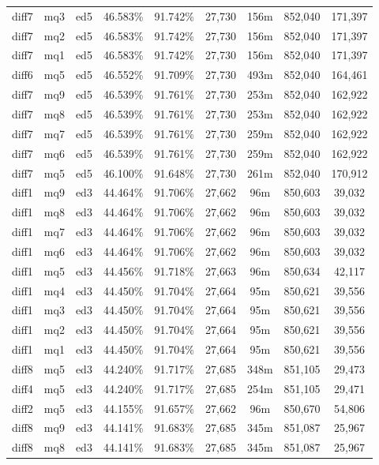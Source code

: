 \begin{landscape}
\begin{longtable}{|c|c|c||c|c||c|c|c|c|}
diff7 & mq3 & ed5 & 46.583\% & 91.742\% & 27,730 & 156m & 852,040 & 171,397 \\
diff7 & mq2 & ed5 & 46.583\% & 91.742\% & 27,730 & 156m & 852,040 & 171,397 \\
diff7 & mq1 & ed5 & 46.583\% & 91.742\% & 27,730 & 156m & 852,040 & 171,397 \\
diff6 & mq5 & ed5 & 46.552\% & 91.709\% & 27,730 & 493m & 852,040 & 164,461 \\
diff7 & mq9 & ed5 & 46.539\% & 91.761\% & 27,730 & 253m & 852,040 & 162,922 \\
diff7 & mq8 & ed5 & 46.539\% & 91.761\% & 27,730 & 253m & 852,040 & 162,922 \\
diff7 & mq7 & ed5 & 46.539\% & 91.761\% & 27,730 & 259m & 852,040 & 162,922 \\
diff7 & mq6 & ed5 & 46.539\% & 91.761\% & 27,730 & 259m & 852,040 & 162,922 \\
diff7 & mq5 & ed5 & 46.100\% & 91.648\% & 27,730 & 261m & 852,040 & 170,912 \\
diff1 & mq9 & ed3 & 44.464\% & 91.706\% & 27,662 & 96m & 850,603 & 39,032 \\
diff1 & mq8 & ed3 & 44.464\% & 91.706\% & 27,662 & 96m & 850,603 & 39,032 \\
diff1 & mq7 & ed3 & 44.464\% & 91.706\% & 27,662 & 96m & 850,603 & 39,032 \\
diff1 & mq6 & ed3 & 44.464\% & 91.706\% & 27,662 & 96m & 850,603 & 39,032 \\
diff1 & mq5 & ed3 & 44.456\% & 91.718\% & 27,663 & 96m & 850,634 & 42,117 \\
diff1 & mq4 & ed3 & 44.450\% & 91.704\% & 27,664 & 95m & 850,621 & 39,556 \\
diff1 & mq3 & ed3 & 44.450\% & 91.704\% & 27,664 & 95m & 850,621 & 39,556 \\
diff1 & mq2 & ed3 & 44.450\% & 91.704\% & 27,664 & 95m & 850,621 & 39,556 \\
diff1 & mq1 & ed3 & 44.450\% & 91.704\% & 27,664 & 95m & 850,621 & 39,556 \\
diff8 & mq5 & ed3 & 44.240\% & 91.717\% & 27,685 & 348m & 851,105 & 29,473 \\
diff4 & mq5 & ed3 & 44.240\% & 91.717\% & 27,685 & 254m & 851,105 & 29,471 \\
diff2 & mq5 & ed3 & 44.155\% & 91.657\% & 27,662 & 96m & 850,670 & 54,806 \\
diff8 & mq9 & ed3 & 44.141\% & 91.683\% & 27,685 & 345m & 851,087 & 25,967 \\
diff8 & mq8 & ed3 & 44.141\% & 91.683\% & 27,685 & 345m & 851,087 & 25,967 \\

\end{longtable}
\end{landscape}
